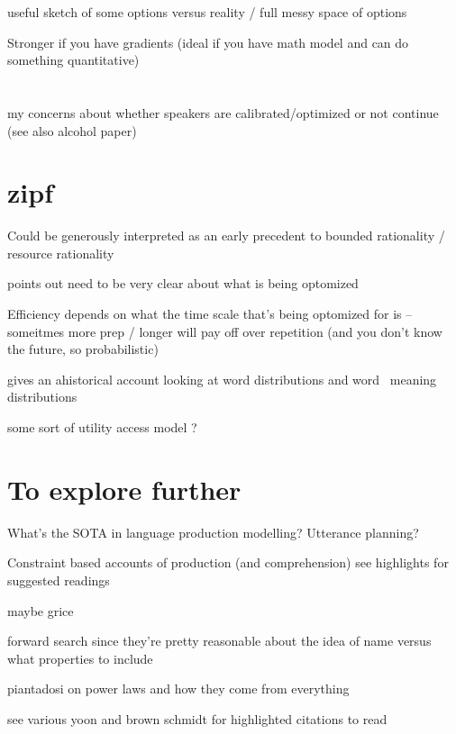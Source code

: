 \documentclass[]{article}
\begin{document}
useful sketch of some options versus reality / full messy space of options

Stronger if you have gradients (ideal if you have math model and can do something quantitative)

\section{}

my concerns about whether speakers are calibrated/optimized or not continue (see also alcohol paper) 

\section{zipf}
Could be generously interpreted as an early precedent to bounded rationality / resource rationality 

points out need to be very clear about what is being optomized

Efficiency depends on what the time scale that's being optomized for is -- someitmes more prep / longer will pay off over repetition (and you don't know the future, so probabilistic)

gives an ahistorical account looking at word distributions and word \ meaning distributions 

some sort of utility access model ? 
\section{To explore further}

What's the SOTA in language production modelling? Utterance planning? 

Constraint based accounts of production (and comprehension) see \cite{hanna2003} highlights for suggested readings

maybe grice

forward search \cite{heller2012} since they're pretty reasonable about the idea of name versus what properties to include 

piantadosi on power laws and how they come from everything 

see various yoon and brown schmidt for highlighted citations to read 

\end{document}
